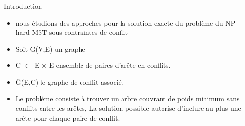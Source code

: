 \begin{frame}{Introduction}

\begin{itemize}

\item nous étudions des approches pour la solution exacte du problème du NP – hard MST sous contraintes de conflit
\item Soit G(V,E) un graphe
\item C $\subset$ E $\times$ E ensemble de paires d'arête en conflits.
\item Ĝ(E,C) le graphe de conflit associé.
\item Le probléme consiste à trouver un arbre couvrant de poids minimum sans conflits entre les arêtes, La solution possible autorise d'inclure au plus une arête pour chaque paire de conflit.
\end{itemize}
\end{frame}
